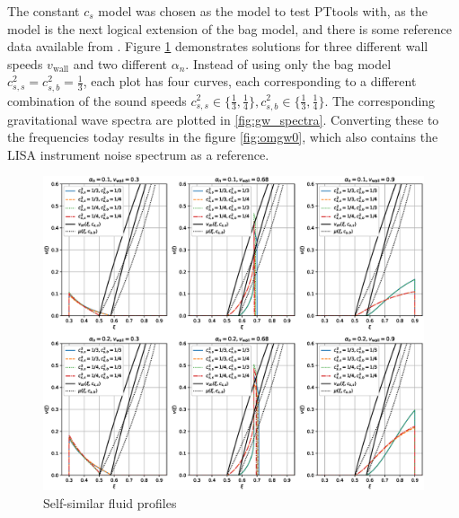 The constant $c_s$ model was chosen as the model to test PTtools with,
as the model is the next logical extension of the bag model,
and there is some reference data available from \cites{giese_2020}{giese_2021}.
Figure \ref{fig:fluid_profiles} demonstrates solutions for three different wall speeds $v_\text{wall}$ and two different $\alpha_n$.
Instead of using only the bag model $c_{s,s}^2 = c_{s,b}^2 = \frac{1}{3}$,
each plot has four curves, each corresponding to a different combination of the sound speeds
$c_{s,s}^2 \in \{ \frac{1}{3}, \frac{1}{4} \}, c_{s,b}^2 \in \{ \frac{1}{3}, \frac{1}{4} \}$.
The corresponding gravitational wave spectra are plotted in \ref{fig:gw_spectra}.
Converting these to the frequencies today results in the figure \ref{fig:omgw0},
which also contains the LISA instrument noise spectrum as a reference.

\begin{figure}[ht!]
\centering
\includegraphics[width=\textwidth]{msc2-python/fig/const_cs_gw_v.eps}
\caption{Self-similar fluid profiles}
\label{fig:fluid_profiles}
\end{figure}

